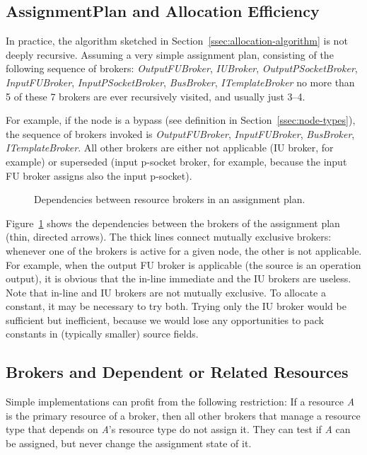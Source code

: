 \documentclass[a4paper,twoside]{tce}
\begin{document}
\subsection{AssignmentPlan and Allocation Efficiency}
\label{ssec:AssignmentPlan-imp}

In practice, the algorithm sketched in
Section~\ref{ssec:allocation-algorithm} is not deeply recursive. Assuming a
very simple assignment plan, consisting of the following sequence of
brokers: \emph{OutputFUBroker}, \emph{IUBroker},
\emph{OutputPSocketBroker}, \emph{InputFUBroker}, \emph{InputPSocketBroker},
\emph{BusBroker}, \emph{ITemplateBroker} no more than 5 of these 7 brokers are 
ever recursively visited, and usually just 3--4.

For example, if the node is a bypass (see definition in
Section~\ref{ssec:node-types}), the sequence of brokers invoked is
\emph{OutputFUBroker}, \emph{InputFUBroker}, \emph{BusBroker}, 
\emph{ITemplateBroker}. All other brokers are either not applicable 
(IU broker, for example) or superseded (input p-socket broker, 
for example, because the input FU broker assigns also the input p-socket).

\begin{figure}[tb]
\centerline{}
\caption{Dependencies between resource brokers in an assignment plan.}
  \label{fig:broker-dependencies}
\end{figure}
%
Figure~\ref{fig:broker-dependencies} shows the dependencies between the
brokers of the assignment plan (thin, directed arrows). The thick lines 
connect mutually exclusive brokers: whenever one
of the brokers is active for a given node, the other is not applicable. For
example, when the output FU broker is applicable (the source is an operation
output), it is obvious that the in-line immediate and the IU brokers are
useless.
%
Note that in-line and IU brokers are not mutually exclusive. To allocate a
constant, it may be necessary to try both. Trying only the IU broker would
be sufficient but inefficient, because we would lose any opportunities to
pack constants in (typically smaller) source fields.

\subsection{Brokers and Dependent or Related Resources}
\label{ssec:broker-dependent-resources}

Simple implementations can profit from the following restriction: If a
resource \emph{A} is the primary resource of a broker, then all other
brokers that manage a resource type that depends on \emph{A}'s resource type
do not assign it. They can test if \emph{A} can be assigned, but never
change the assignment state of it.
\end{document}

